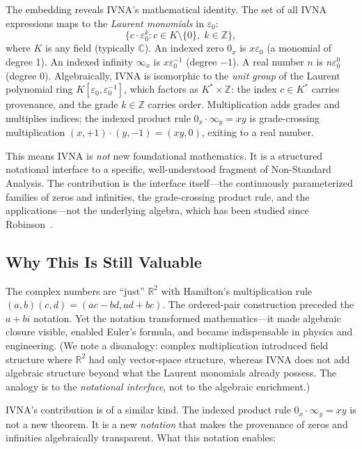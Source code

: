 \documentclass[12pt]{article}
\theoremstyle{definition}
\theoremstyle{remark}
\newcommand{\vz}[1]{0_{#1}}             %
\newcommand{\vi}[1]{\infty_{#1}}        %
\newcommand{\R}{\mathbb{R}}
\newcommand{\C}{\mathbb{C}}
\begin{document}
The embedding reveals IVNA's mathematical identity. The set of all
IVNA expressions maps to the \emph{Laurent monomials} in $\varepsilon_0$:
\[
\{c \cdot \varepsilon_0^k : c \in K \setminus \{0\},\; k \in \mathbb{Z}\},
\]
where $K$ is any field (typically $\C$).
An indexed zero $\vz{x}$ is $x\varepsilon_0$ (a monomial of degree 1).
An indexed infinity $\vi{x}$ is $x\varepsilon_0^{-1}$ (degree $-1$).
A real number $n$ is $n\varepsilon_0^0$ (degree 0). Algebraically,
IVNA is isomorphic to the \emph{unit group} of the Laurent polynomial
ring $K[\varepsilon_0, \varepsilon_0^{-1}]$, which factors as
$K^* \times \mathbb{Z}$: the index $c \in K^*$ carries provenance,
and the grade $k \in \mathbb{Z}$ carries order. Multiplication adds
grades and multiplies indices; the indexed product rule
$\vz{x} \cdot \vi{y} = xy$ is grade-crossing multiplication
$(x, +1) \cdot (y, -1) = (xy, 0)$, exiting to a real number.

This means IVNA is \emph{not} new foundational mathematics. It is a
structured notational interface to a specific, well-understood fragment
of Non-Standard Analysis. The contribution is the interface itself---the
continuously parameterized families of zeros and infinities, the
grade-crossing product rule, and the applications---not the underlying
algebra, which has been studied since Robinson~\cite{robinson1966}.

\subsection{Why This Is Still Valuable}

The complex numbers are ``just'' $\R^2$ with Hamilton's multiplication
rule $(a,b)(c,d) = (ac-bd, ad+bc)$. The ordered-pair construction
preceded the $a + bi$ notation. Yet the notation transformed
mathematics---it made algebraic closure visible, enabled Euler's
formula, and became indispensable in physics and engineering. (We
note a disanalogy: complex multiplication introduced field structure
where $\R^2$ had only vector-space structure, whereas IVNA does not
add algebraic structure beyond what the Laurent monomials already
possess. The analogy is to the \emph{notational interface}, not to
the algebraic enrichment.)

IVNA's contribution is of a similar kind. The indexed product rule
$\vz{x} \cdot \vi{y} = xy$ is not a new theorem. It is a new
\emph{notation} that makes the provenance of zeros and infinities
algebraically transparent. What this notation enables:
\end{document}
